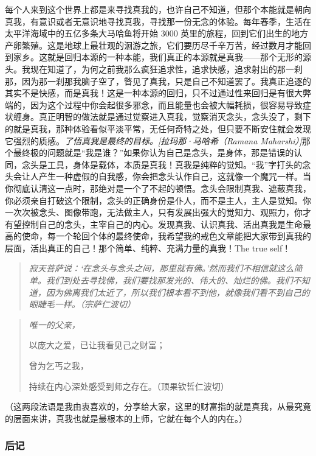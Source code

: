 每个人来到这个世界上都是来寻找真我的，也许自己不知道，但那个本能就是朝向真我，有意识或者无意识地寻找真我，寻找那一份无念的体验。每年春季，生活在太平洋海域中的五亿多条大马哈鱼将开始 3000 英里的旅程，回到它们出生的地方产卵繁殖。这是地球上最壮观的洄游之旅，它们要历尽千辛万苦，经过数月才能回到家乡。这就是回归本源的一种本能，我们真正的本源就是真我——那个无形的源头。我现在知道了，为何之前我那么疯狂追求性，追求快感，追求射出的那一刹那，因为那一刹那我脑子空了，瞥见了真我，只是自己不知道罢了。我真正追逐的其实不是快感，而是真我！这是一种本源的回归，只不过通过性来回归是有很大弊端的，因为这个过程中你会起很多邪念，而且能量也会被大幅耗损，很容易导致症状缠身。真正明智的做法就是通过觉察进入真我，觉察消灭念头，念头没了，剩下的就是真我，那种体验看似平淡平常，无任何奇特之处，但只要不断安住就会发现它强烈的质感。\textit{了悟真我是最终的目标。[拉玛那·马哈希（Ramana Maharshi）]}那个最终极的问题就是“我是谁？”如果你认为自己是念头，是身体，那是错误的认同，念头是工具，身体是载体，本质是真我！真我是纯粹的觉知。“我”字打头的念头会让人产生一种虚假的自我感，你会把念头认作自己，这就像一个魔咒一样。当你彻底认清这一点时，那绝对是一个了不起的顿悟。念头会限制真我、遮蔽真我，你必须亲自打破这个限制，念头的正确身份是仆人，而不是主人，主人是觉知。你一次次被念头、图像带跑，无法做主人，只有发展出强大的觉知力、观照力，你才有望控制自己的念头，主宰自己的内心。发现真我、认识真我、活出真我是生命最高的使命，每一个轮回个体的最终使命，我希望我的戒色文章能把大家带到真我的层面，活出真正的自己！那个简单、纯粹、充满力量的真我！The true self！

\begin{quote}\it
    寂天菩萨说：‘在念头与念头之间，那里就有佛。’然而我们不相信就这么简单。我们到处去寻找佛，我们要找那发光的、伟大的、灿烂的佛。我们不知道，因为佛离我们太近了，所以我们根本看不到他，就像我们看不到自己的眼睫毛一样。（宗萨仁波切）
\end{quote}

\begin{quotation}\it
    唯一的父亲，

    以庞大之爱，已让我看见己之财富；

    曾为乞丐之我，

    持续在内心深处感受到师之存在。（顶果钦哲仁波切）
\end{quotation}

（这两段法语是我由衷喜欢的，分享给大家，这里的财富指的就是真我，从最究竟的层面来讲，真我也就是最根本的上师，它就在每个人的内在。）

\subsubsection{后记}

